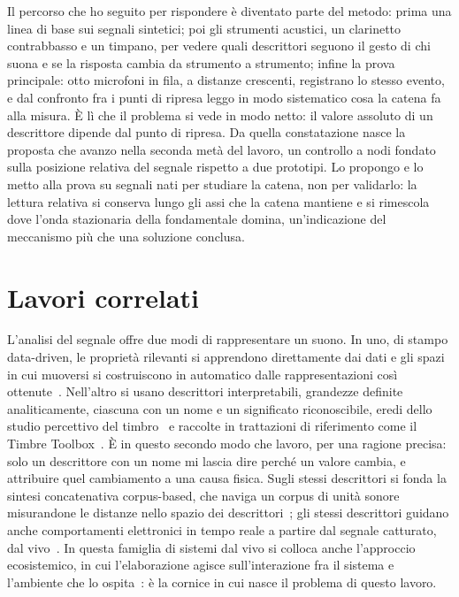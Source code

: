 \documentclass{article}
\begin{document}
Il percorso che ho seguito per rispondere è diventato parte del metodo: %
 prima una linea di base sui segnali sintetici; %
 poi gli strumenti acustici, un clarinetto contrabbasso e un timpano, per vedere quali descrittori seguono il gesto di chi suona e se la risposta cambia da strumento a strumento; infine la prova principale: otto microfoni in fila, a distanze crescenti, registrano lo stesso evento, e dal confronto fra i punti di ripresa leggo in modo sistematico cosa la catena fa alla misura. È lì che il problema si vede in modo netto: il valore assoluto di un descrittore dipende dal punto di ripresa. Da quella constatazione nasce la proposta che avanzo nella seconda metà del lavoro, un controllo a nodi fondato sulla posizione relativa del segnale rispetto a due prototipi. Lo propongo e lo metto alla prova su segnali nati per studiare la catena, non per validarlo: la lettura relativa si conserva lungo gli assi che la catena mantiene e si rimescola dove l'onda stazionaria della fondamentale domina, un'indicazione del meccanismo più che una soluzione conclusa.

\section{Lavori correlati}\label{sec:correlati}
L'analisi del segnale offre due modi di rappresentare un suono. In uno, di stampo data-driven, le proprietà rilevanti si apprendono direttamente dai dati e gli spazi in cui muoversi si costruiscono in automatico dalle rappresentazioni così ottenute~\cite{roma2019adaptive}. Nell'altro si usano descrittori interpretabili, grandezze definite analiticamente, ciascuna con un nome e un significato riconoscibile, eredi dello studio percettivo del timbro~\cite{mcadams1995perceptual} e raccolte in trattazioni di riferimento come il Timbre Toolbox~\cite{peeters2004largeset,peeters2011timbre,lerch2023introduction}. È in questo secondo modo che lavoro, per una ragione precisa: solo un descrittore con un nome mi lascia dire perché un valore cambia, e attribuire quel cambiamento a una causa fisica. Sugli stessi descrittori si fonda la sintesi concatenativa corpus-based, che naviga un corpus di unità sonore misurandone le distanze nello spazio dei descrittori~\cite{schwarz2006catart}; gli stessi descrittori guidano anche comportamenti elettronici in tempo reale a partire dal segnale catturato, dal vivo~\cite{park2004towards,bullock2008implementing}. In questa famiglia di sistemi dal vivo si colloca anche l'approccio ecosistemico, in cui l'elaborazione agisce sull'interazione fra il sistema e l'ambiente che lo ospita~\cite{discipio2003sound}: è la cornice in cui nasce il problema di questo lavoro.
\end{document}
